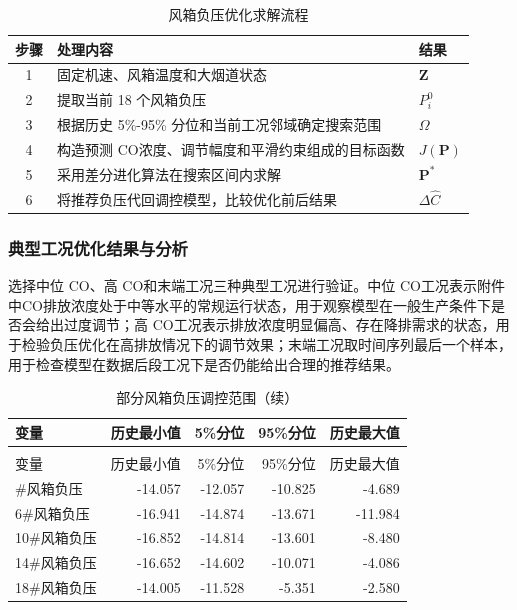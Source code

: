 \documentclass[UTF8,a4paper,zihao=-4]{ctexart}
\newcommand{\CO}{CO}
\begin{document}
\begin{table}[H]
\centering
\caption{风箱负压优化求解流程}
\begin{tabular}{c p{7.0cm} >{\centering\arraybackslash}p{3.2cm}}
\toprule
步骤 & 处理内容 & 结果 \\
\midrule
1 & 固定机速、风箱温度和大烟道状态 & $\mathbf Z$ \\
2 & 提取当前 18 个风箱负压 & $P_i^0$ \\
3 & 根据历史 5\%-95\% 分位和当前工况邻域确定搜索范围 & $\Omega$ \\
4 & 构造预测 \CO 浓度、调节幅度和平滑约束组成的目标函数 & $J(\mathbf P)$ \\
5 & 采用差分进化算法在搜索区间内求解 & $\mathbf P^*$ \\
6 & 将推荐负压代回调控模型，比较优化前后结果 & $\Delta \hat C$ \\
\bottomrule
\end{tabular}
\end{table}

\subsubsection{典型工况优化结果与分析}
选择中位 \CO 、高 \CO 和末端工况三种典型工况进行验证。中位 \CO 工况表示附件中\CO 排放浓度处于中等水平的常规运行状态，用于观察模型在一般生产条件下是否会给出过度调节；高 \CO 工况表示排放浓度明显偏高、存在降排需求的状态，用于检验负压优化在高排放情况下的调节效果；末端工况取时间序列最后一个样本，用于检查模型在数据后段工况下是否仍能给出合理的推荐结果。
\begin{longtable}{l r r r r}
\caption{部分风箱负压调控范围}\\
\toprule
变量 & 历史最小值 & 5\%分位 & 95\%分位 & 历史最大值 \\
\midrule
\endfirsthead
\caption[]{部分风箱负压调控范围（续）}\\
\toprule
变量 & 历史最小值 & 5\%分位 & 95\%分位 & 历史最大值 \\
\midrule
\endhead
\bottomrule
\endfoot
1\#风箱负压 & -14.057 & -12.057 & -10.825 & -4.689 \\
6\#风箱负压 & -16.941 & -14.874 & -13.671 & -11.984 \\
10\#风箱负压 & -16.852 & -14.814 & -13.601 & -8.480 \\
14\#风箱负压 & -16.652 & -14.602 & -10.071 & -4.086 \\
18\#风箱负压 & -14.005 & -11.528 & -5.351 & -2.580 
\label{tab.3.1}
\end{longtable}
\end{document}
